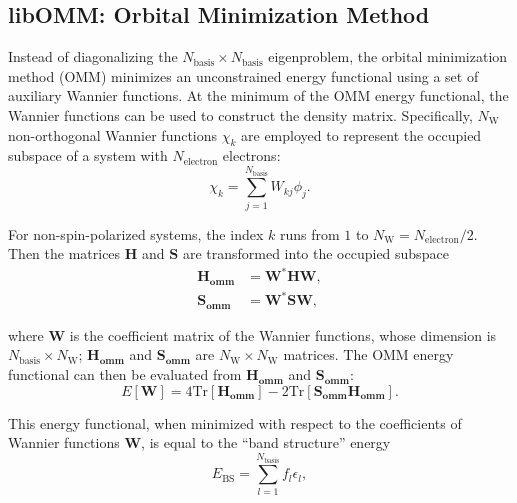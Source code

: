 \documentclass{report}
\begin{document}
\subsection{libOMM:  Orbital Minimization Method}
\label{subsec:solvers_omm}
Instead of diagonalizing the $N_\text{basis} \times N_\text{basis}$ eigenproblem, the orbital minimization method (OMM) minimizes an unconstrained energy functional using a set of auxiliary Wannier functions.  At the minimum of the OMM energy functional, the Wannier functions can be used to construct the density matrix.  Specifically, $N_\text{W}$ non-orthogonal Wannier functions $\chi_k$ are employed to represent the occupied subspace of a system with $N_\text{electron}$ electrons:\\
\begin{equation}
\label{eq:wannier}
\chi_k = \sum_{j=1}^{N_\text{basis}} W_{kj} \phi_j .
\end{equation}

\noindent For non-spin-polarized systems, the index $k$ runs from $1$ to $N_\text{W} = N_\text{electron}/2$.  Then the matrices $\boldsymbol{H}$ and $\boldsymbol{S}$ are transformed into the occupied subspace\\
\begin{equation}
\label{eq:reduced_ham_ovlp}
\begin{split}
\boldsymbol{H_\text{omm}} & = \boldsymbol{W}^* \boldsymbol{H} \boldsymbol{W} ,\\
\boldsymbol{S_\text{omm}} & = \boldsymbol{W}^* \boldsymbol{S} \boldsymbol{W} ,
\end{split}
\end{equation}

\noindent where $\boldsymbol{W}$ is the coefficient matrix of the Wannier functions, whose dimension is $N_\text{basis} \times N_\text{W}$; $\boldsymbol{H_\text{omm}}$ and $\boldsymbol{S_\text{omm}}$ are $N_\text{W} \times N_\text{W}$ matrices.  The OMM energy functional can then be evaluated from $\boldsymbol{H_\text{omm}}$ and $\boldsymbol{S_\text{omm}}$:\\
\begin{equation}
\label{eq:omm_energy}
E[\boldsymbol{W}] = 4 \text{Tr}[\boldsymbol{H_\text{omm}}] - 2 \text{Tr}[\boldsymbol{S_\text{omm} H_\text{omm}}] .
\end{equation}

\noindent This energy functional, when minimized with respect to the coefficients of Wannier functions $\boldsymbol{W}$, is equal to the ``band structure'' energy\\
\begin{equation}
\label{eq:bs_energy}
E_\text{BS} = \sum_{l=1}^{N_\text{basis}} f_l \epsilon_l ,
\end{equation}
\end{document}
